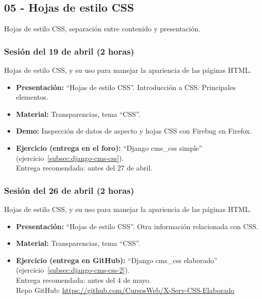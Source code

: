 \documentclass[a4paper,12pt]{article}
\begin{document}
\subsection{05 - Hojas de estilo CSS}

Hojas de estilo CSS, separación entre contenido y presentación.

\subsubsection{Sesión del 19 de abril (2 horas)}

Hojas de estilo CSS, y su uso para manejar la apariencia de las páginas HTML.

\begin{itemize}
\item \textbf{Presentación:} ``Hojas de estilo CSS''. Introducción a CSS. Principales elementos.
 \item \textbf{Material:} Transparencias, tema ``CSS''.
\item \textbf{Demo:} Inspección de datos de aspecto y hojas CSS con Firebug en Firefox.
\item \textbf{Ejercicio (entrega en el foro):} ``Django cms\_css simple'' (ejercicio~\ref{subsec:django-cms-css}). \\
Entrega recomendada: antes del 27 de abril.
\end{itemize}

\subsubsection{Sesión del 26 de abril (2 horas)}

Hojas de estilo CSS, y su uso para manejar la apariencia de las páginas HTML.

\begin{itemize}
\item \textbf{Presentación:} ``Hojas de estilo CSS''. Otra información relacionada con CSS.
 \item \textbf{Material:} Transparencias, tema ``CSS''.
\item \textbf{Ejercicio (entrega en GitHub):} ``Django cms\_css elaborado'' (ejercicio~\ref{subsec:django-cms-css-2}). \\
  Entrega recomendada: antes del 4 de mayo. \\
  Repo GitHub: \url{https://github.com/CursosWeb/X-Serv-CSS-Elaborado}
\end{itemize}
\end{document}
